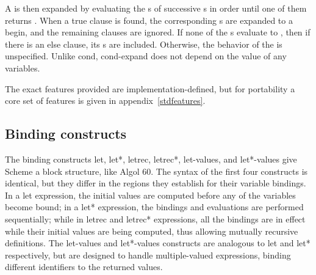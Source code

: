 \begin{entry}{%
}
A  is then expanded by evaluating the
s of successive s
in order until one of them returns \schtrue.  When a true clause is
found, the corresponding s are expanded to a
{\cf begin}, and the remaining clauses are ignored.
If none of the s evaluate to \schtrue, then
if there is an else clause, its s are
included.  Otherwise, the behavior of the  is unspecified.
Unlike {\cf cond}, {\cf cond-expand} does not depend on the value
of any variables.

The exact features provided are implementation-defined, but for
portability a core set of features is given in
appendix~\ref{stdfeatures}.

\end{entry}

\subsection{Binding constructs}
\label{bindingsection}

The binding constructs {\cf let}, {\cf let*}, {\cf letrec}, {\cf letrec*},
{\cf let-values}, and {\cf let*-values}
give Scheme a block structure, like Algol 60.  The syntax of the first four
constructs is identical, but they differ in the regions they establish
for their variable bindings.  In a {\cf let} expression, the initial
values are computed before any of the variables become bound; in a
{\cf let*} expression, the bindings and evaluations are performed
sequentially; while in {\cf letrec} and {\cf letrec*} expressions,
all the bindings are in
effect while their initial values are being computed, thus allowing
mutually recursive definitions.
The {\cf let-values} and {\cf let*-values} constructs are analogous to {\cf let} and {\cf let*}
respectively, but are designed to handle multiple-valued expressions, binding
different identifiers to the returned values.

